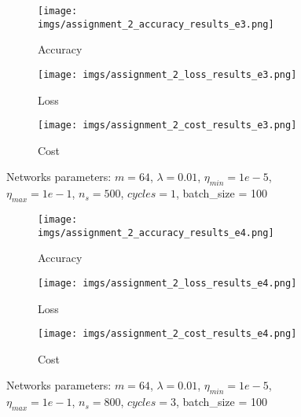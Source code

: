 \documentclass{article}
\begin{document}
\begin{figure}[h!]
    \centering
    \begin{subfigure}[b]{0.45\textwidth}
        \centering
        \texttt{[image: imgs/assignment\_2\_accuracy\_results\_e3.png]}
        \caption{Accuracy}
    \end{subfigure}
    \begin{subfigure}[b]{0.45\textwidth}
        \centering
        \texttt{[image: imgs/assignment\_2\_loss\_results\_e3.png]}
        \caption{Loss}
    \end{subfigure}
    \begin{subfigure}[b]{0.45\textwidth}
        \centering
        \texttt{[image: imgs/assignment\_2\_cost\_results\_e3.png]}
        \caption{Cost}
    \end{subfigure}
    \caption{Networks parameters: $m = 64$, $\lambda = 0.01$, $\eta_{min} = 1e-5$, $\eta_{max} = 1e-1$, $n_s = 500$, $cycles = 1$, batch\_size = 100}
    \label{fig:experiment1}
\end{figure}

\begin{figure}[h!]
    \centering
    \begin{subfigure}[b]{0.45\textwidth}
        \centering
        \texttt{[image: imgs/assignment\_2\_accuracy\_results\_e4.png]}
        \caption{Accuracy}
    \end{subfigure}
    \begin{subfigure}[b]{0.45\textwidth}
        \centering
        \texttt{[image: imgs/assignment\_2\_loss\_results\_e4.png]}
        \caption{Loss}
    \end{subfigure}
    \begin{subfigure}[b]{0.45\textwidth}
        \centering
        \texttt{[image: imgs/assignment\_2\_cost\_results\_e4.png]}
        \caption{Cost}
    \end{subfigure}
    \caption{Networks parameters: $m = 64$, $\lambda = 0.01$, $\eta_{min} = 1e-5$, $\eta_{max} = 1e-1$, $n_s = 800$, $cycles = 3$, batch\_size = 100}
    \label{fig:experiment2}
\end{figure}

\newpage

\end{document}

